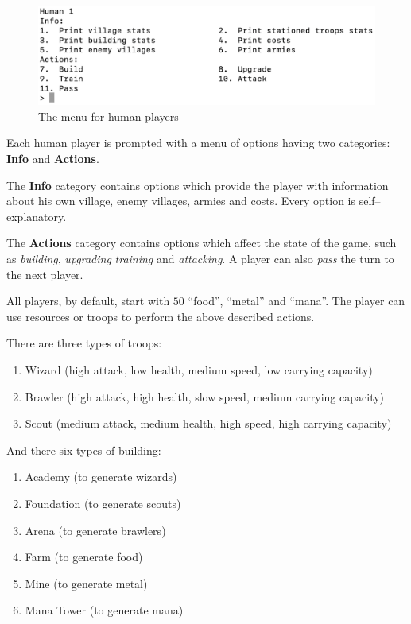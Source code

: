 \documentclass[12pt]{article}
\begin{document}
\begin{figure}[H]
    \centering
    \includegraphics[width=12cm]{./images/player-menu-village-war-game.png}
    \caption{The menu for human players}
    \label{player-menu-village-war-game}
\end{figure}

Each human player is prompted with a menu of options having two
categories: \textbf{Info} and \textbf{Actions}.

The \textbf{Info} category contains options which provide the
player with information about his own village, enemy villages,
armies and costs. Every option is self--explanatory.

The \textbf{Actions} category contains options which affect the
state of the game, such as \textit{building}, \textit{upgrading}
\textit{training} and \textit{attacking}. A player can also
\textit{pass} the turn to the next player.

All players, by default, start with $50$ ``food'', ``metal'' and
``mana''. The player can use resources or troops to perform the
above described actions.

There are three types of troops:

\begin{enumerate}
    \item Wizard (high attack, low health, medium speed, low
        carrying capacity)
    \item Brawler (high attack, high health, slow speed, medium
        carrying capacity)
    \item Scout (medium attack, medium health, high speed, high
        carrying capacity)
\end{enumerate}

And there six types of building:

\begin{enumerate}
    \item Academy (to generate wizards)
    \item Foundation (to generate scouts)
    \item Arena (to generate brawlers)
    \item Farm (to generate food)
    \item Mine (to generate metal)
    \item Mana Tower (to generate mana)
\end{enumerate}
\end{document}
